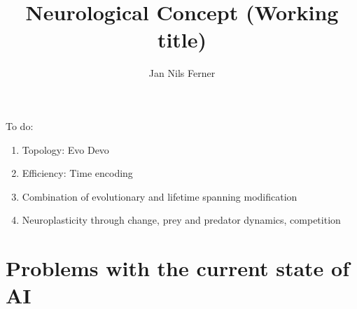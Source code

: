 \documentclass[a4paper]{article}
\title{Neurological Concept (Working title)}
\author{Jan Nils Ferner}
\begin{document}
\maketitle
\thispagestyle{empty}

\clearpage

\twocolumn

\begin{abstract}
	
\end{abstract}

\clearpage

\onecolumn
\tableofcontents
\twocolumn

\clearpage

To do:
\begin{enumerate}
	\item Topology: Evo Devo
	\item Efficiency: Time encoding
	\item Combination of evolutionary and lifetime spanning modification
	\item Neuroplasticity through change, prey and predator dynamics, competition
\end{enumerate}

\section{Problems with the current state of AI}
	

\clearpage

\nocite{*}


\end{document}
